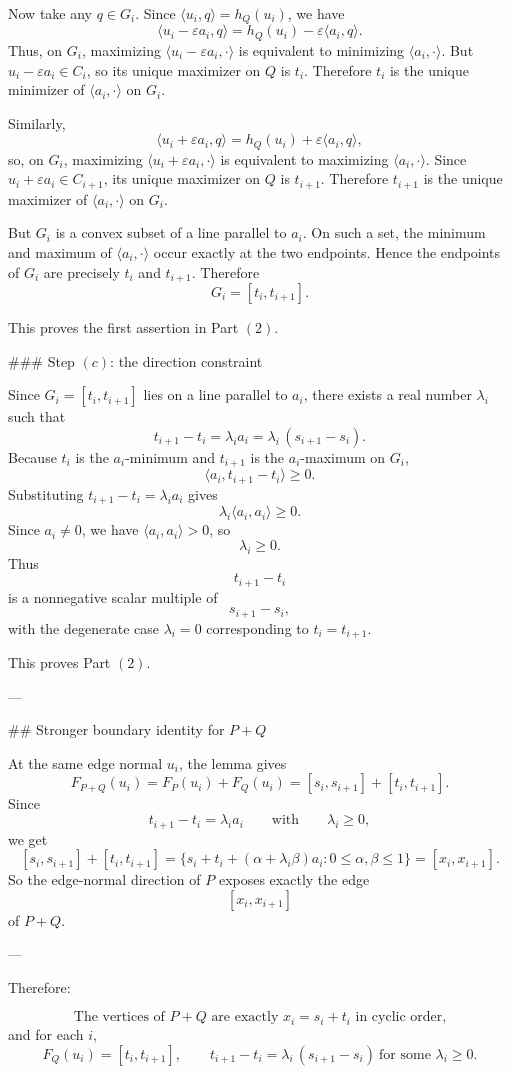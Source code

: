 Now take any \(q\in G_i\). Since \(\langle u_i,q\rangle=h_Q(u_i)\), we have
\[
\langle u_i-\varepsilon a_i,q\rangle
=
h_Q(u_i)-\varepsilon\langle a_i,q\rangle.
\]
Thus, on \(G_i\), maximizing \(\langle u_i-\varepsilon a_i,\cdot\rangle\) is equivalent to minimizing \(\langle a_i,\cdot\rangle\). But \(u_i-\varepsilon a_i\in C_i\), so its unique maximizer on \(Q\) is \(t_i\). Therefore \(t_i\) is the unique minimizer of \(\langle a_i,\cdot\rangle\) on \(G_i\).

Similarly,
\[
\langle u_i+\varepsilon a_i,q\rangle
=
h_Q(u_i)+\varepsilon\langle a_i,q\rangle,
\]
so, on \(G_i\), maximizing \(\langle u_i+\varepsilon a_i,\cdot\rangle\) is equivalent to maximizing \(\langle a_i,\cdot\rangle\). Since \(u_i+\varepsilon a_i\in C_{i+1}\), its unique maximizer on \(Q\) is \(t_{i+1}\). Therefore \(t_{i+1}\) is the unique maximizer of \(\langle a_i,\cdot\rangle\) on \(G_i\).

But \(G_i\) is a convex subset of a line parallel to \(a_i\). On such a set, the minimum and maximum of \(\langle a_i,\cdot\rangle\) occur exactly at the two endpoints. Hence the endpoints of \(G_i\) are precisely \(t_i\) and \(t_{i+1}\). Therefore
\[
G_i=[t_i,t_{i+1}].
\]

This proves the first assertion in Part \((2)\).

### Step \((c)\): the direction constraint

Since \(G_i=[t_i,t_{i+1}]\) lies on a line parallel to \(a_i\), there exists a real number \(\lambda_i\) such that
\[
t_{i+1}-t_i=\lambda_i a_i
=
\lambda_i\,(s_{i+1}-s_i).
\]
Because \(t_i\) is the \(a_i\)-minimum and \(t_{i+1}\) is the \(a_i\)-maximum on \(G_i\),
\[
\langle a_i,t_{i+1}-t_i\rangle\ge 0.
\]
Substituting \(t_{i+1}-t_i=\lambda_i a_i\) gives
\[
\lambda_i\langle a_i,a_i\rangle\ge 0.
\]
Since \(a_i\neq 0\), we have \(\langle a_i,a_i\rangle>0\), so
\[
\lambda_i\ge 0.
\]
Thus
\[
t_{i+1}-t_i
\]
is a nonnegative scalar multiple of
\[
s_{i+1}-s_i,
\]
with the degenerate case \(\lambda_i=0\) corresponding to \(t_i=t_{i+1}\).

This proves Part \((2)\).

---

## Stronger boundary identity for \(P+Q\)

At the same edge normal \(u_i\), the lemma gives
\[
F_{P+Q}(u_i)=F_P(u_i)+F_Q(u_i)
=
[s_i,s_{i+1}]+[t_i,t_{i+1}].
\]
Since
\[
t_{i+1}-t_i=\lambda_i a_i
\qquad\text{with}\qquad
\lambda_i\ge 0,
\]
we get
\[
[s_i,s_{i+1}]+[t_i,t_{i+1}]
=
\{s_i+t_i+(\alpha+\lambda_i\beta)a_i:0\le \alpha,\beta\le 1\}
=
[x_i,x_{i+1}].
\]
So the edge-normal direction of \(P\) exposes exactly the edge
\[
[x_i,x_{i+1}]
\]
of \(P+Q\).

---

Therefore:

\[
\boxed{\text{The vertices of }P+Q\text{ are exactly }x_i=s_i+t_i\text{ in cyclic order,}}
\]
and for each \(i\),
\[
\boxed{F_Q(u_i)=[t_i,t_{i+1}],\qquad
t_{i+1}-t_i=\lambda_i\,(s_{i+1}-s_i)\ \text{for some }\lambda_i\ge 0.}
\]

